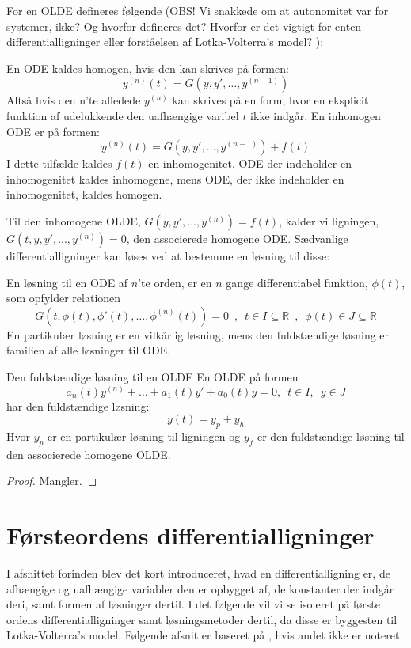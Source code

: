 For en OLDE defineres følgende (OBS! Vi snakkede om at autonomitet var for systemer, ikke? Og hvorfor defineres det? Hvorfor er det vigtigt for enten differentialligninger eller forståelsen af Lotka-Volterra's model? ):
\begin{definition}[Homogenitet]
En ODE kaldes homogen, hvis den kan skrives på formen: 
$$y^{(n)}(t)=G(y,y', \hdots, y^{(n-1)})$$ 
Altså hvis den n'te afledede $y^{(n)}$ kan skrives på en form, hvor en eksplicit funktion af udelukkende den uafhængige varibel $t$ ikke indgår. En inhomogen ODE er på formen: 
$$y^{(n)}(t)=G(y,y',\hdots, y^{(n-1)})+f(t)$$
I dette tilfælde kaldes $f(t)$ en inhomogenitet. ODE der indeholder en inhomogenitet kaldes inhomogene, mens ODE, der ikke indeholder en inhomogenitet, kaldes homogen.
\end{definition}
Til den inhomogene OLDE, $G(y,y',...,y^{(n)})=f(t)$, kalder vi ligningen, $G(t,y,y',...,y^{(n)})=0$, den associerede homogene ODE. Sædvanlige differentialligninger kan løses ved at bestemme en løsning til disse:
\begin{definition} 
En løsning til en ODE af $n$'te orden, er en $n$ gange differentiabel funktion, $\phi (t)$, som opfylder relationen
$$G(t,\phi (t),\phi '(t), \hdots, \phi^{(n)}(t))=0 \enspace ,\enspace t\in I \subseteq \mathbb{R} \enspace , \enspace \phi (t) \in J \subseteq \mathbb{R}$$
En partikulær løsning er en vilkårlig løsning, mens den fuldstændige løsning er familien af alle løsninger til ODE.
\end{definition}

\begin{mytheo}{Den fuldstændige løsning til en OLDE}{}
En OLDE på formen 
$$a_n(t)y^{(n)}+\hdots +a_1(t)y'+a_0(t)y=0, \enspace t\in I, \enspace y\in J$$
har den fuldstændige løsning:
$$y(t)=y_p+y_h$$
Hvor $y_p$ er en partikulær løsning til ligningen og $y_f$ er den fuldstændige løsning til den associerede homogene OLDE.
\end{mytheo}
\begin{proof}\hfill \break
Mangler.
\end{proof}
\section{Førsteordens differentialligninger}
I afsnittet forinden blev det kort introduceret, hvad en differentialligning er, de afhængige og uafhængige variabler den er opbygget af, de konstanter der indgår deri, samt formen af løsninger dertil. I det følgende vil vi se isoleret på første ordens differentialligninger samt løsningsmetoder dertil, da disse er byggesten til Lotka-Volterra's model.
Følgende afsnit er baseret på \citep{JAB}, hvis andet ikke er noteret.
